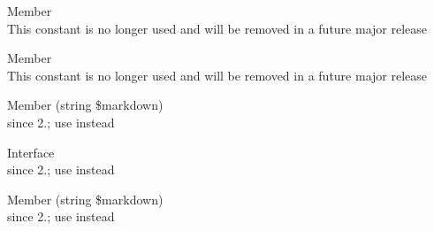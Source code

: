 \begin{DoxyRefList}
\item[Member \doxylink{class_league_1_1_common_mark_1_1_extension_1_1_smart_punct_1_1_quote_parser_adc90f0e7b98e93bb02dcf2e57c4ed343}{League\textbackslash{}Common\+Mark\textbackslash{}Extension\textbackslash{}Smart\+Punct\textbackslash{}Quote\+Parser\+::DOUBLE\+\_\+\+QUOTES} ]\hfill \\
\label{deprecated__deprecated000077}%
%
This constant is no longer used and will be removed in a future major release  
\item[Member \doxylink{class_league_1_1_common_mark_1_1_extension_1_1_smart_punct_1_1_quote_parser_ae4ac41e5b03867edb1ae68d08a7ae000}{League\textbackslash{}Common\+Mark\textbackslash{}Extension\textbackslash{}Smart\+Punct\textbackslash{}Quote\+Parser\+::SINGLE\+\_\+\+QUOTES} ]\hfill \\
\label{deprecated__deprecated000078}%
%
This constant is no longer used and will be removed in a future major release  
\item[Member \doxylink{class_league_1_1_common_mark_1_1_markdown_converter_a778c74f4546dc9763e21a676403af8ff}{League\textbackslash{}Common\+Mark\textbackslash{}Markdown\+Converter\+::convert\+To\+Html} (string \$markdown)]\hfill \\
\label{deprecated__deprecated000079}%
%
since 2.; use {\ttfamily {}} instead 
\item[Interface \doxylink{interface_league_1_1_common_mark_1_1_markdown_converter_interface}{League\textbackslash{}Common\+Mark\textbackslash{}Markdown\+Converter\+Interface} ]\hfill \\
\label{deprecated__deprecated000080}%
%
since 2.; use {\ttfamily {}} instead  
\item[Member \doxylink{interface_league_1_1_common_mark_1_1_markdown_converter_interface_a9a80ea5232884b88f7d99f08a56865f6}{League\textbackslash{}Common\+Mark\textbackslash{}Markdown\+Converter\+Interface\+::convert\+To\+Html} (string \$markdown)]\hfill \\
\label{deprecated__deprecated000081}%
%
since 2.; use {\ttfamily {}} instead 

\end{DoxyRefList}
